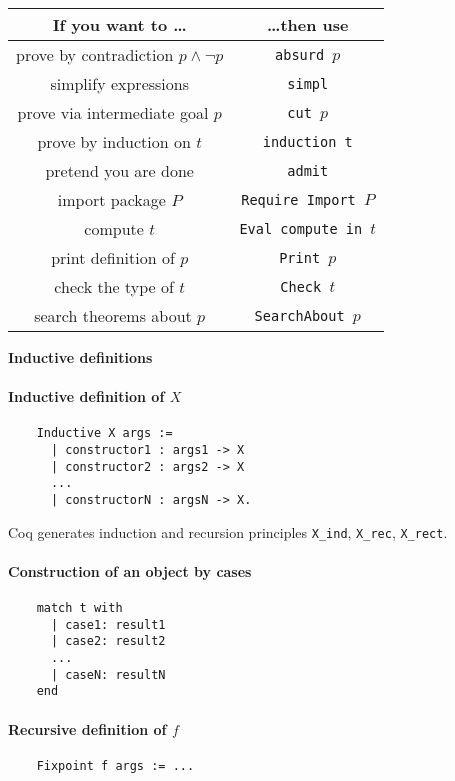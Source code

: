 \documentclass[11pt]{article}
\begin{document}
\begin{center}
  \bigskip

  \begin{tabular}{|c|c|}
    \hline
    \textbf{If you want to \dots} & \textbf{\dots then use}
    \\ \hline
    prove by contradiction $p \land \lnot p$ & \texttt{absurd $p$}
    \\ \hline
    simplify expressions & \texttt{simpl}
    \\ \hline
    prove via intermediate goal $p$ & \texttt{cut $p$}
    \\ \hline
    prove by induction on $t$ & \texttt{induction t}
    \\ \hline
    pretend you are done & \texttt{admit}
    \\ \hline
    import package $P$ & \texttt{Require Import $P$}
    \\ \hline
    compute $t$ & \texttt{Eval compute in $t$}
    \\ \hline
    print definition of $p$ & \texttt{Print $p$}
    \\ \hline
    check the type of $t$ & \texttt{Check $t$}
    \\ \hline
    search theorems about $p$ & \texttt{SearchAbout $p$}
    \\ \hline
  \end{tabular}
\end{center}

\newpage

\begin{center}
  {\Large \textbf{Inductive definitions}}
\end{center}

\bigskip
\bigskip

\paragraph{Inductive definition of $X$}
\label{sec:induct-defin-x}

\begin{verbatim}
    Inductive X args :=
      | constructor1 : args1 -> X
      | constructor2 : args2 -> X
      ...
      | constructorN : argsN -> X.
\end{verbatim}
%
Coq generates induction and recursion principles \texttt{X\_ind},
\texttt{X\_rec}, \texttt{X\_rect}.

\paragraph{Construction of an object by cases}

\begin{verbatim}
    match t with
      | case1: result1
      | case2: result2
      ...
      | caseN: resultN
    end
\end{verbatim}

\paragraph{Recursive definition of $f$}

\begin{verbatim}
    Fixpoint f args := ...
\end{verbatim}
\end{document}
